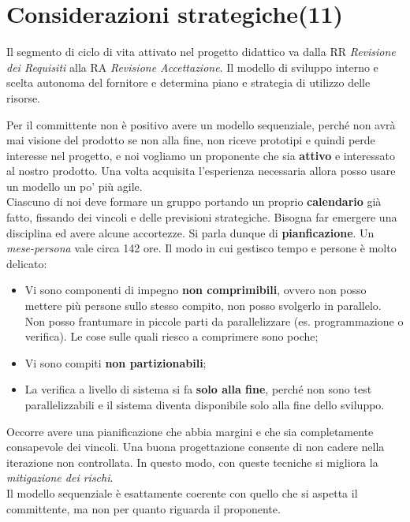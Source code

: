 



\section{Considerazioni strategiche(11)}

Il segmento di ciclo di vita attivato nel progetto didattico va dalla RR \textit{Revisione dei Requisiti} alla RA \textit{Revisione Accettazione}. Il modello di sviluppo interno e scelta autonoma del fornitore e determina piano e strategia di utilizzo delle risorse.

Per il committente non è positivo avere un modello sequenziale, perché non avrà  mai visione del prodotto se non alla fine, non riceve prototipi e quindi perde interesse nel progetto, e noi vogliamo un proponente che sia \textbf{attivo} e interessato al nostro prodotto. Una volta acquisita l'esperienza necessaria allora posso usare un modello un po' più agile.\\
Ciascuno di noi deve formare un gruppo portando un proprio \textbf{calendario} già  fatto, fissando dei vincoli e delle previsioni strategiche. Bisogna far emergere una disciplina ed avere alcune accortezze. Si parla dunque di \textbf{pianficazione}. Un \textit{mese-persona} vale circa 142 ore. Il modo in cui gestisco tempo e persone è molto delicato:

\begin{itemize}

	\item Vi sono componenti di impegno \textbf{non comprimibili}, ovvero non posso mettere più persone sullo stesso compito, non posso svolgerlo in parallelo. Non posso frantumare in piccole parti da parallelizzare (es. programmazione o verifica). Le cose sulle quali riesco a comprimere sono poche;
	\item Vi sono compiti \textbf{non partizionabili};
	\item La verifica a livello di sistema si fa \textbf{solo alla fine}, perché non sono test parallelizzabili e il sistema diventa disponibile solo alla fine dello sviluppo.

\end{itemize}

Occorre avere una pianificazione che abbia margini e che sia completamente consapevole dei vincoli. Una buona progettazione consente di non cadere nella iterazione non controllata. In questo modo, con queste tecniche si migliora la \textit{mitigazione dei rischi}.\\
Il modello sequenziale è esattamente coerente con quello che si aspetta il committente, ma non per quanto riguarda il proponente.\\

